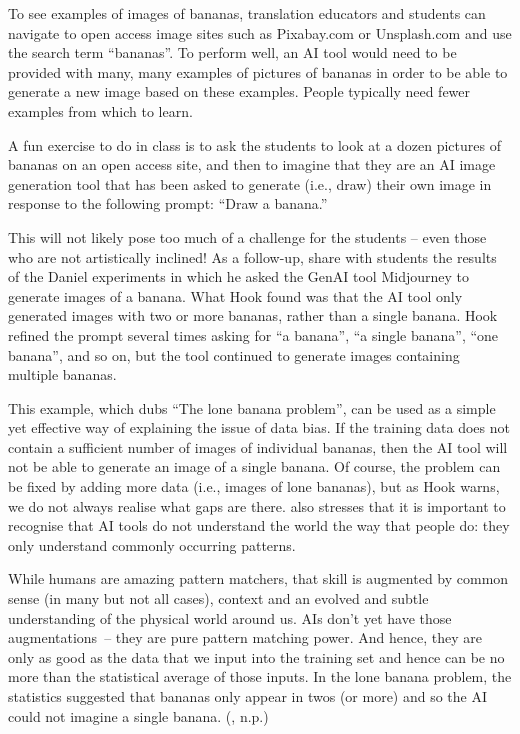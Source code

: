\documentclass[output=paper]{langscibook}
\begin{document}
To see examples of images of bananas, translation educators and students can navigate to open access image sites such as Pixabay.com or Unsplash.com and use the search term “bananas”. To perform well, an AI tool would need to be provided with many, many examples of pictures of bananas in order to be able to generate a new image based on these examples. People typically need fewer examples from which to learn.

A fun exercise to do in class is to ask the students to look at a dozen pictures of bananas on an open access site, and then to imagine that they are an AI image generation tool that has been asked to generate (i.e., draw) their own image in response to the following prompt: “Draw a banana.”

This will not likely pose too much of a challenge for the students – even those who are not artistically inclined! As a follow-up, share with students the results of the Daniel \citet{hook2023} experiments in which he asked the GenAI tool Midjourney to generate images of a banana. What Hook found was that the AI tool only generated images with two or more bananas, rather than a single banana. Hook refined the prompt several times asking for “a banana”, “a single banana”, “one banana”, and so on, but the tool continued to generate images containing multiple bananas.

This example, which \citet{hook2023} dubs “The lone banana problem”, can be used as a simple yet effective way of explaining the issue of data bias. If the training data does not contain a sufficient number of images of individual bananas, then the AI tool will not be able to generate an image of a single banana. Of course, the problem can be fixed by adding more data (i.e., images of lone bananas), but as Hook warns, we do not always realise what gaps are there. \citet{hook2023} also stresses that it is important to recognise that AI tools do not understand the world the way that people do: they only understand commonly occurring patterns.

While humans are amazing pattern matchers, that skill is augmented by common sense (in many but not all cases), context and an evolved and subtle understanding of the physical world around us. AIs don’t yet have those augmentations~– they are pure pattern matching power. And hence, they are only as good as the data that we input into the training set and hence can be no more than the statistical average of those inputs. In the lone banana problem, the statistics suggested that bananas only appear in twos (or more) and so the AI could not imagine a single banana. (\citealt{hook2023}, n.p.)
\end{document}
